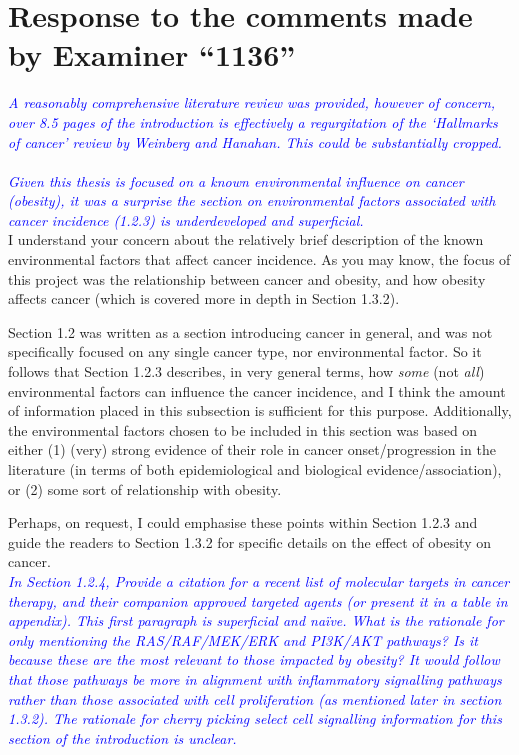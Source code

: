 \documentclass[a4paper, 12pt]{article}
\begin{document}
\section*{Response to the comments made by Examiner ``1136''}
\label{sec:response_to_comments_from_examiner_1136}

\noindent
\textcolor{blue}{
	\textit{A reasonably comprehensive literature review was provided, however of concern, over 8.5 pages of the introduction is effectively a regurgitation of the `Hallmarks of cancer' review by Weinberg and Hanahan.
	This could be substantially cropped.
	}
}\\

\noindent
\\

\noindent
\textcolor{blue}{
	\textit{Given this thesis is focused on a known environmental influence on cancer (obesity), it was a surprise the section on environmental factors associated with cancer incidence (1.2.3) is underdeveloped and superficial.
	}
}\\

\noindent
I understand your concern about the relatively brief description of the known environmental factors that affect cancer incidence.
As you may know, the focus of this project was the relationship between cancer and obesity, and how obesity affects cancer (which is covered more in depth in Section 1.3.2).

Section 1.2 was written as a section introducing cancer in general, and was not specifically focused on any single cancer type, nor environmental factor.
So it follows that Section 1.2.3 describes, in very general terms, how \textit{some} (not \textit{all}) environmental factors can influence the cancer incidence, and I think the amount of information placed in this subsection is sufficient for this purpose.
Additionally, the environmental factors chosen to be included in this section was based on either (1) (very) strong evidence of their role in cancer onset/progression in the literature (in terms of both epidemiological and biological evidence/association), or (2) some sort of relationship with obesity.

Perhaps, on request, I could emphasise these points within Section 1.2.3 and guide the readers to Section 1.3.2 for specific details on the effect of obesity on cancer.
\\

\noindent
\textcolor{blue}{
	\textit{In Section 1.2.4, Provide a citation for a recent list of molecular targets in cancer therapy, and their companion approved targeted agents (or present it in a table in appendix).
	This first paragraph is superficial and na\"ive.
	What is the rationale for only mentioning the RAS/RAF/MEK/ERK and PI3K/AKT pathways?
	Is it because these are the most relevant to those impacted by obesity?
	It would follow that those pathways be more in alignment with inflammatory signalling pathways rather than those associated with cell proliferation (as mentioned later in section 1.3.2).
	The rationale for cherry picking select cell signalling information for this section of the introduction is unclear.
	}
}\\
\end{document}
